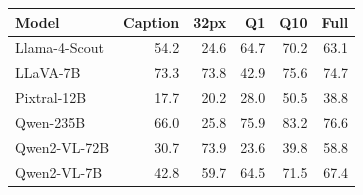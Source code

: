 \begin{tabular}{lrrrrr}
\toprule
Model & Caption & 32px & Q1 & Q10 & Full \\
\midrule
Llama-4-Scout & 54.2 & 24.6 & 64.7 & 70.2 & 63.1 \\
LLaVA-7B & 73.3 & 73.8 & 42.9 & 75.6 & 74.7 \\
Pixtral-12B & 17.7 & 20.2 & 28.0 & 50.5 & 38.8 \\
Qwen-235B & 66.0 & 25.8 & 75.9 & 83.2 & 76.6 \\
Qwen2-VL-72B & 30.7 & 73.9 & 23.6 & 39.8 & 58.8 \\
Qwen2-VL-7B & 42.8 & 59.7 & 64.5 & 71.5 & 67.4 \\
\bottomrule
\end{tabular}
